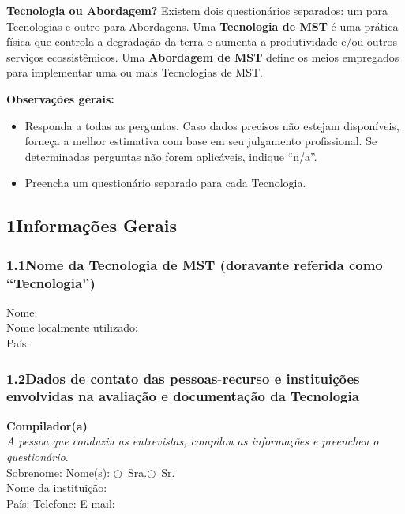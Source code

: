 \medskip\noindent
\textbf{Tecnologia ou Abordagem?} Existem dois questionários separados: um para Tecnologias e outro para Abordagens. Uma \textbf{Tecnologia de MST} é uma prática física que controla a degradação da terra e aumenta a produtividade e/ou outros serviços ecossistêmicos. Uma \textbf{Abordagem de MST} define os meios empregados para implementar uma ou mais Tecnologias de MST.

\medskip\noindent
\textbf{Observações gerais:}
\begin{itemize}[nosep]
  \item Responda a todas as perguntas. Caso dados precisos não estejam disponíveis, forneça a melhor estimativa com base em seu julgamento profissional. Se determinadas perguntas não forem aplicáveis, indique ``n/a''.
  \item Preencha um questionário separado para cada Tecnologia.
\end{itemize}

\subsection*{1\quad Informações Gerais}

\subsubsection*{1.1\quad Nome da Tecnologia de MST (doravante referida como ``Tecnologia'')}

Nome: \dotfill\\
Nome localmente utilizado: \dotfill\\
País: \dotfill

\subsubsection*{1.2\quad Dados de contato das pessoas-recurso e instituições envolvidas na avaliação e documentação da Tecnologia}

\noindent\textbf{Compilador(a)}\\
\textit{A pessoa que conduziu as entrevistas, compilou as informações e preencheu o questionário.}\\[4pt]
Sobrenome: \dotfill\quad Nome(s): \dotfill\quad $\bigcirc$~Sra.\quad $\bigcirc$~Sr.\\
Nome da instituição: \dotfill\\
País: \dotfill\quad Telefone: \dotfill\quad E-mail: \dotfill

